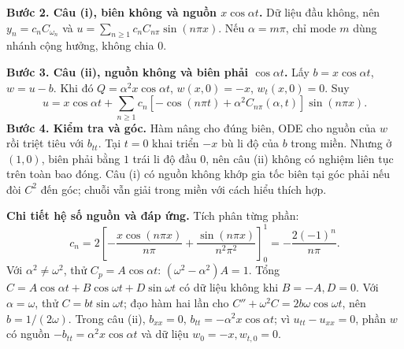 \documentclass[10pt,a4paper]{article}
\begin{document}
\textbf{Bước 2. Câu (i), biên không và nguồn $x\cos\alpha t$.} Dữ liệu đầu không, nên $y_n=c_nC_{\omega_n}$ và $u=\sum_{n\ge1}c_nC_{n\pi}\sin(n\pi x)$. Nếu $\alpha=m\pi$, chỉ mode $m$ dùng nhánh cộng hưởng, không chia $0$.

\textbf{Bước 3. Câu (ii), nguồn không và biên phải $\cos\alpha t$.} Lấy $b=x\cos\alpha t$, $w=u-b$. Khi đó $Q=\alpha^2x\cos\alpha t$, $w(x,0)=-x$, $w_t(x,0)=0$. Suy
\[u=x\cos\alpha t+\sum_{n\ge1}c_n[-\cos(n\pi t)+\alpha^2C_{n\pi}(\alpha,t)]\sin(n\pi x).\]
\textbf{Bước 4. Kiểm tra và góc.} Hàm nâng cho đúng biên, ODE cho nguồn của $w$ rồi triệt tiêu với $b_{tt}$. Tại $t=0$ khai triển $-x$ bù li độ của $b$ trong miền. Nhưng ở $(1,0)$, biên phải bằng $1$ trái li độ đầu $0$, nên câu (ii) không có nghiệm liên tục trên toàn bao đóng. Câu (i) có nguồn không khớp gia tốc biên tại góc phải nếu đòi $C^2$ đến góc; chuỗi vẫn giải trong miền với cách hiểu thích hợp.

\textbf{Chi tiết hệ số nguồn và đáp ứng.} Tích phân từng phần:
\[c_n=2\left[-\frac{x\cos(n\pi x)}{n\pi}+
\frac{\sin(n\pi x)}{n^2\pi^2}\right]_0^1
=-\frac{2(-1)^n}{n\pi}.\]
Với $\alpha^2\ne\omega^2$, thử $C_p=A\cos\alpha t$: $(\omega^2-\alpha^2)A=1$. Tổng $C=A\cos\alpha t+B\cos\omega t+D\sin\omega t$ có dữ liệu không khi $B=-A,D=0$. Với $\alpha=\omega$, thử $C=bt\sin\omega t$; đạo hàm hai lần cho $C''+\omega^2C=2b\omega\cos\omega t$, nên $b=1/(2\omega)$. Trong câu (ii), $b_{xx}=0$, $b_{tt}=-\alpha^2x\cos\alpha t$; vì $u_{tt}-u_{xx}=0$, phần $w$ có nguồn $-b_{tt}=\alpha^2x\cos\alpha t$ và dữ liệu $w_0=-x,w_{t,0}=0$.
\end{document}
